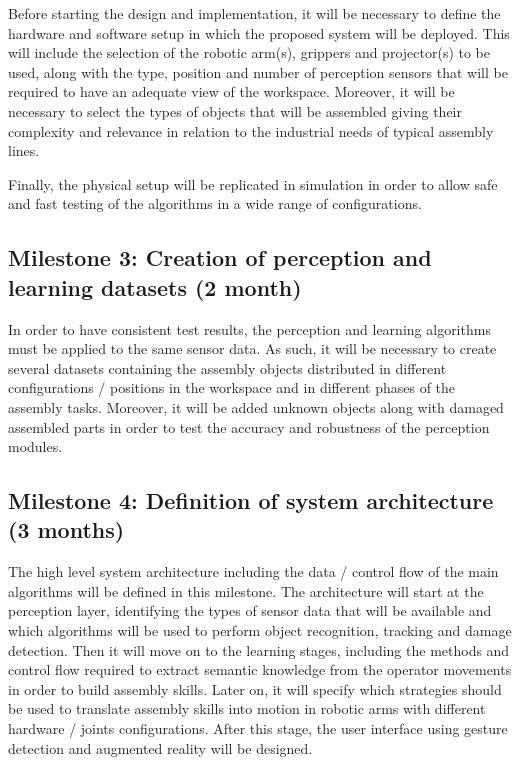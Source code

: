 Before starting the design and implementation, it will be necessary to define the hardware and software setup in which the proposed system will be deployed. This will include the selection of the robotic arm(s), grippers and projector(s) to be used, along with the type, position and number of perception sensors that will be required to have an adequate view of the workspace. Moreover, it will be necessary to select the types of objects that will be assembled giving their complexity and relevance in relation to the industrial needs of typical assembly lines.

Finally, the physical setup will be replicated in simulation in order to allow safe and fast testing of the algorithms in a wide range of configurations.


\subsection{Milestone 3: Creation of perception and learning datasets (2 month)}

In order to have consistent test results, the perception and learning algorithms must be applied to the same sensor data. As such, it will be necessary to create several datasets containing the assembly objects distributed in different configurations / positions in the workspace and in different phases of the assembly tasks. Moreover, it will be added unknown objects along with damaged assembled parts in order to test the accuracy and robustness of the perception modules.


\subsection{Milestone 4: Definition of system architecture (3 months)}

The high level system architecture including the data / control flow of the main algorithms will be defined in this milestone. The architecture will start at the perception layer, identifying the types of sensor data that will be available and which algorithms will be used to perform object recognition, tracking and damage detection. Then it will move on to the learning stages, including the methods and control flow required to extract semantic knowledge from the operator movements in order to build assembly skills. Later on, it will specify which strategies should be used to translate assembly skills into motion in robotic arms with different hardware / joints configurations. After this stage, the user interface using gesture detection and augmented reality will be designed.


